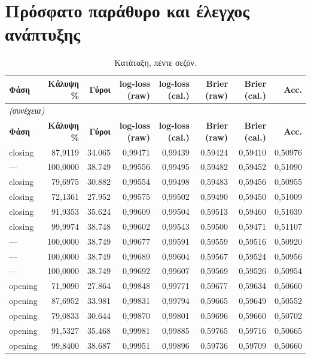 \section{Πρόσφατο παράθυρο και έλεγχος ανάπτυξης}
{\scriptsize
\begin{longtable}{@{}lrrrrrrr@{}}
\caption{Κατάταξη, πέντε σεζόν.}\label{app:rw}\\
\toprule \textbf{Φάση} & \textbf{Κάλυψη \%} & \textbf{Γύροι} & \textbf{log-loss (raw)} & \textbf{log-loss (cal.)} & \textbf{Brier (raw)} & \textbf{Brier (cal.)} & \textbf{Acc.} \\\midrule\endfirsthead
\multicolumn{8}{l}{\emph{(συνέχεια)}}\\\toprule \textbf{Φάση} & \textbf{Κάλυψη \%} & \textbf{Γύροι} & \textbf{log-loss (raw)} & \textbf{log-loss (cal.)} & \textbf{Brier (raw)} & \textbf{Brier (cal.)} & \textbf{Acc.} \\\midrule\endhead
\bottomrule\endfoot
closing & 87,9119 & 34.065 & 0,99471 & 0,99439 & 0,59424 & 0,59410 & 0,50976 \\
--- & 100,0000 & 38.749 & 0,99556 & 0,99495 & 0,59482 & 0,59452 & 0,51090 \\
closing & 79,6975 & 30.882 & 0,99554 & 0,99498 & 0,59483 & 0,59456 & 0,50955 \\
closing & 72,1361 & 27.952 & 0,99575 & 0,99502 & 0,59490 & 0,59450 & 0,51009 \\
closing & 91,9353 & 35.624 & 0,99609 & 0,99504 & 0,59513 & 0,59460 & 0,51039 \\
closing & 99,9974 & 38.748 & 0,99602 & 0,99543 & 0,59500 & 0,59471 & 0,51107 \\
--- & 100,0000 & 38.749 & 0,99677 & 0,99591 & 0,59559 & 0,59516 & 0,50920 \\
--- & 100,0000 & 38.749 & 0,99689 & 0,99604 & 0,59567 & 0,59524 & 0,50956 \\
--- & 100,0000 & 38.749 & 0,99692 & 0,99607 & 0,59569 & 0,59526 & 0,50954 \\
opening & 71,9090 & 27.864 & 0,99848 & 0,99771 & 0,59677 & 0,59634 & 0,50660 \\
opening & 87,6952 & 33.981 & 0,99831 & 0,99794 & 0,59665 & 0,59649 & 0,50552 \\
opening & 79,0833 & 30.644 & 0,99870 & 0,99801 & 0,59696 & 0,59660 & 0,50702 \\
opening & 91,5327 & 35.468 & 0,99981 & 0,99885 & 0,59765 & 0,59716 & 0,50665 \\
opening & 99,8400 & 38.687 & 0,99951 & 0,99896 & 0,59736 & 0,59709 & 0,50660 \\
\end{longtable}
}

